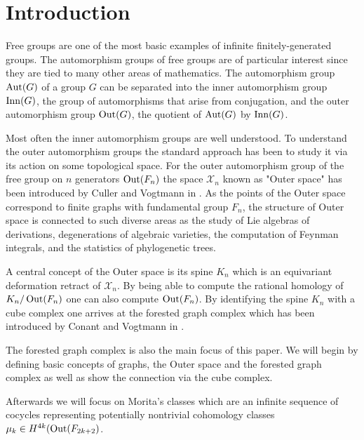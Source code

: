 %

\usepackage{todonotes}
\usepackage{./tikzit/tikzit}
\usepackage{biblatex}


\usepackage[stable]{footmisc}

	

\section{Introduction\footnotemark}
Free groups are one of the most basic examples of infinite finitely-generated groups.
The automorphism groups of free groups are of particular interest since they are tied to many other areas of mathematics.
The automorphism group $\operatorname{Aut}(G)$ of a group $G$ can be separated into the inner automorphism group $\operatorname{Inn}(G)$,
the group of automorphisms that arise from conjugation, and the outer automorphism group $\operatorname{Out}(G)$, the quotient of  $\operatorname{Aut}(G)$ by $\operatorname{Inn}(G)$.

Most often the inner automorphism groups are well understood.  To understand the outer automorphism groups
the standard approach has been to study it via its action on some topological space.
For the outer automorphism group of the free group on $n$ generators $\operatorname{Out}(F_{n})$ the space $\mathcal{X}_{n}$ known as "Outer space"
has been introduced by Culler and Vogtmann in \cite{vogtmann86}. As the points of the Outer space correspond to finite graphs with fundamental group $F_{n}$,
the structure of Outer space is connected to such diverse areas as the study of Lie algebras of derivations, degenerations of algebraic varieties,
the computation of Feynman integrals, and the statistics of phylogenetic trees.

A central concept of the Outer space is its spine $K_{n}$ which is an equivariant deformation retract of $\mathcal{X}_{n}$.
By being able to compute the rational homology of $K_{n} / \operatorname{Out}(F_{n})$ one can also compute $\operatorname{Out}(F_{n})$.
By identifying the spine $K_{n}$ with a cube complex one arrives at the forested graph complex
which has been introduced by Conant and Vogtmann in \cite{conant03}.

The forested graph complex is also the main focus of this paper.
We will begin by defining basic concepts of graphs, the Outer space and the forested graph complex as well as show the connection via the cube complex.

Afterwards we will focus on Morita's classes which are an infinite sequence of cocycles representing potentially nontrivial cohomology classes $\mu_{k} \in H^{4k}(\operatorname{Out}(F_{2k+2})$.



